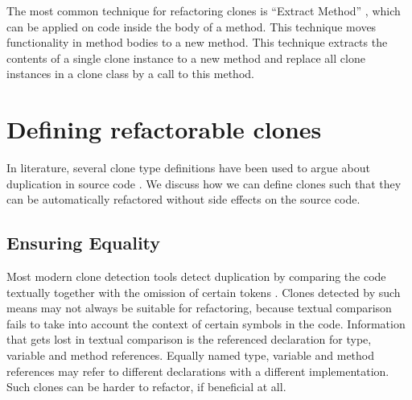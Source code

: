\documentclass[sigconf,review, table]{acmart}
\begin{document}

The most common technique for refactoring clones is ``Extract Method'' \cite{fowler2018refactoring}, which can be applied on code inside the body of a method. This technique moves functionality in method bodies to a new method. This technique extracts the contents of a single clone instance to a new method and replace all clone instances in a clone class by a call to this method.


\section{Defining refactorable clones}
In literature, several clone type definitions have been used to argue about duplication in source code \cite{roy2007survey}. We discuss how we can define clones such that they can be automatically refactored without side effects on the source code.

\subsection{Ensuring Equality}\label{sec:t1r}
Most modern clone detection tools detect duplication by comparing the code textually together with the omission of certain tokens \cite{roy2009comparison, svajlenko2014evaluating}. Clones detected by such means may not always be suitable for refactoring, because textual comparison fails to take into account the context of certain symbols in the code. Information that gets lost in textual comparison is the referenced declaration for type, variable and method references. Equally named type, variable and method references may refer to different declarations with a different implementation. Such clones can be harder to refactor, if beneficial at all.
\end{document}
